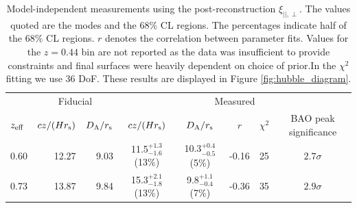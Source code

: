 \documentclass[a4paper,fleqn,usenatbib]{mnras}
\begin{document}
\begin{table}
\begin{centering}
\caption{Model-independent measurements using the post-reconstruction $\xi_{||,\perp}$. The values quoted are the modes and the $68\%$ CL regions. The percentages indicate half of the $68\%$ CL regions. $r$ denotes the correlation between parameter fits. Values for the $z=0.44$ bin are not reported as the data was insufficient to provide constraints and final surfaces were heavily dependent on choice of prior.In the $\chi^2$ fitting we use 36 DoF. These results are displayed in Figure \ref{fig:hubble_diagram}.}
\label{tab:hda_wigglez_reconstructed}
\begin{tabular}{ l | r | r | c | c | c | c | c }
\hline
              & \multicolumn{2}{c|}{Fiducial} & \multicolumn{5}{c}{Measured} \\  
$z_{\rm eff}$ & $cz/(H r_{\rm s})$ & $D_{\rm A}/r_{\rm s}$  & $cz/(H r_{\rm s})$ & $D_{\rm A}/r_{\rm s}$  & $r$ & $\chi^2$ & BAO peak significance \\
\hline
  0.60  & 12.27 & 9.03 & 11.5$^{+1.3}_{-1.6}$ (13\%)  & 10.3$^{+0.4}_{-0.5}$ (5\%)   & -0.16  & 25 & $2.7\sigma$ \\
  0.73  & 13.87 & 9.84 & 15.3$^{+2.1}_{-1.8}$ (13\%)  &  9.8$^{+1.1}_{-0.4}$ (7\%)   & -0.36  & 35 & $2.9\sigma$ \\
\end{tabular}

\end{centering}
\end{table}
\end{document}
